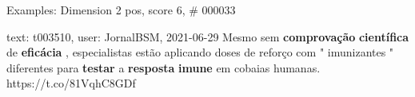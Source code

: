 \begin{frame}{Examples: Dimension 2 pos, score 6, \# 000033}
\footnotesize
\begin{exampleblock}{text: t003510, user: JornalBSM, 2021-06-29}
Mesmo sem \textbf{comprovação} \textbf{científica} de \textbf{eficácia} , 
especialistas estão aplicando doses de reforço com " imunizantes " diferentes 
para \textbf{testar} a \textbf{resposta} \textbf{imune} em cobaias humanas. 
https://t.co/81VqhC8GDf 
\end{exampleblock}
\end{frame}
